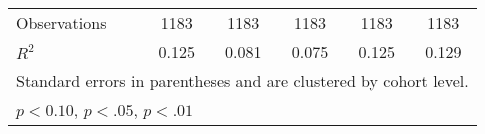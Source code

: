 \begin{table}[htbp]
\begin{adjustbox}{max width=0.6\textwidth}
\begin{tabular}{l*{5}{c}}
\hline
Observations      &        1183         &        1183         &        1183         &        1183         &        1183         \\
\(R^{2}\)   &       0.125         &       0.081         &       0.075         &       0.125         &       0.129         \\
\hline\hline
\multicolumn{6}{l}{\footnotesize Standard errors in parentheses and are clustered by cohort level.}\\
\multicolumn{6}{l}{\footnotesize \sym{*} \(p<0.10\), \sym{**} \(p<.05\), \sym{***} \(p<.01\)}\\
\end{tabular}%
	\end{adjustbox}
\end{table}
